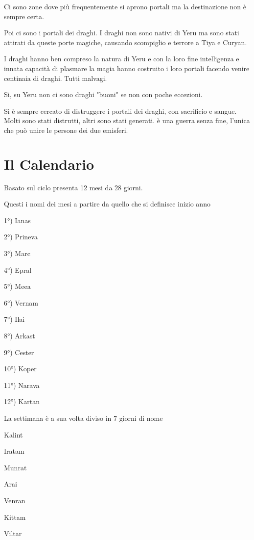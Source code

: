 \documentclass[a4paper,11pt,twoside,openany]{book}
\begin{document}
{Ci sono zone dove più frequentemente si aprono portali ma la destinazione non è sempre certa.

Poi ci sono i portali dei draghi. I draghi non sono nativi di Yeru ma sono stati attirati da queste porte magiche, causando scompiglio e terrore a Tiya e Curyan.

I draghi hanno ben compreso la natura di Yeru e con la loro fine intelligenza e innata capacità di plasmare la magia hanno costruito i loro portali facendo venire centinaia di draghi. Tutti malvagi.

Si, su Yeru non ci sono draghi "buoni" se non con poche eccezioni.

Si è sempre cercato di distruggere i portali dei draghi, con sacrificio e sangue. Molti sono stati distrutti, altri sono stati generati. è una guerra senza fine, l'unica che può unire le persone dei due emisferi. 

\pagebreak

\section{Il Calendario}

\label{il-calendario}

Basato sul ciclo presenta 12 mesi da 28 giorni.

Questi i nomi dei mesi a partire da quello che si definisce inizio
anno
\bigskip

1°) Ianas

2°) Prineva

3°) Marc

4°) Epral

5°) Meea

6°) Vernam

7°) Ilai

8°) Arkast

9°) Cester

10°) Koper

11°) Narava

12°) Kartan

\bigskip
La settimana è a sua volta diviso in 7 giorni di nome

Kalint

Iratam

Munrat

Arai

Venran

Kittam

Viltar\\

}
\end{document}

